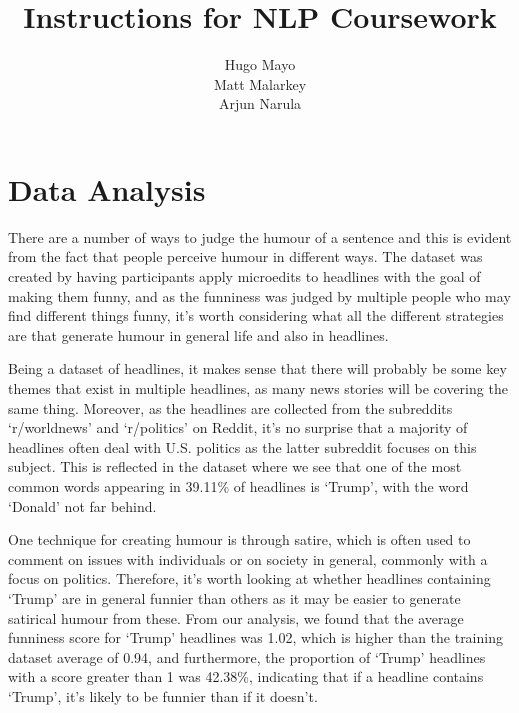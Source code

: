 \documentclass[11pt,a4paper]{article}
\title{Instructions for NLP Coursework}
\author{Hugo Mayo \\\And
  Matt Malarkey
  \\\And Arjun Narula\\}
\date{}
\begin{document}
\maketitle

\section{Data Analysis}

There are a number of ways to judge the humour of a sentence and this is evident from the fact that people perceive humour in different ways. The dataset was created by having participants apply microedits to headlines with the goal of making them funny, and as the funniness was judged by multiple people who may find different things funny, it’s worth considering what all the different strategies are that generate humour in general life and also in headlines. 

Being a dataset of headlines, it makes sense that there will probably be some key themes that exist in multiple headlines, as many news stories will be covering the same thing. Moreover, as the headlines are collected from the subreddits ‘r/worldnews’ and ‘r/politics’ on Reddit, it’s no surprise that a majority of headlines often deal with U.S. politics as the latter subreddit focuses on this subject. This is reflected in the dataset where we see that one of the most common words appearing in 39.11\% of headlines is ‘Trump’, with the word ‘Donald’ not far behind. 

One technique for creating humour is through satire, which is often used to comment on issues with individuals or on society in general, commonly with a focus on politics. Therefore, it’s worth looking at whether headlines containing ‘Trump’ are in general funnier than others as it may be easier to generate satirical humour from these.  From our analysis, we found that the average funniness score for ‘Trump’ headlines was 1.02, which is higher than the training dataset average of 0.94, and furthermore, the proportion of ‘Trump’ headlines with a score greater than 1 was 42.38\%, indicating that if a headline contains ‘Trump’, it’s likely to be funnier than if it doesn’t.
\end{document}
